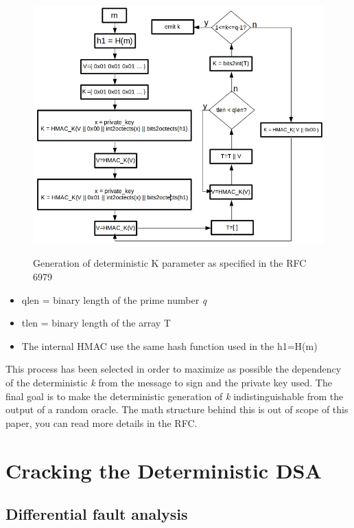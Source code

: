 \documentclass[11pt,english]{article}
\begin{document}
\begin{figure}[H]
\includegraphics[width=1.0\textwidth]{img/img_2.png} \\
\caption{Generation of deterministic K parameter as specified in the RFC 6979} 
\end{figure}

\begin{itemize}
\item qlen = binary length of the prime number \textit{q}
\item tlen = binary length of the array T 
\item The internal HMAC use the same hash function used in the h1=H(m)
\end{itemize}

This process has been selected in order to maximize as possible the dependency of the deterministic \textit{k} from the message to sign and the private key used. The final goal is to make the deterministic generation of \textit{k} indistinguishable from the output of a random oracle. The math structure behind this is out of scope of this paper, you can read more details in the RFC\cite{rfc}. 

\section{Cracking the Deterministic DSA}

\subsection{Differential fault analysis}
\end{document}
